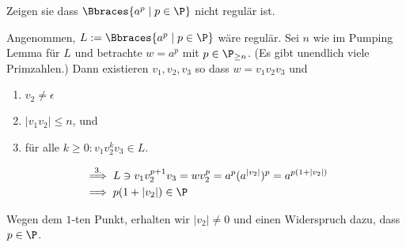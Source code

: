 
\begin{exercise}

Zeigen sie dass $\Bbraces{a^p \mid p \in \P}$ nicht regulär ist.

\end{exercise}


\begin{solution}

Angenommen, $L := \Bbraces{a^p \mid p \in \P}$ wäre regulär.
Sei $n$ wie im Pumping Lemma für $L$ und betrachte $w = a^p$ mit $p \in \P_{\geq n}$.
(Es gibt unendlich viele Primzahlen.)
Dann existieren $v_1, v_2, v_3$ so dass $w = v_1 v_2 v_3$ und

\begin{enumerate}
    \item $v_2 \neq \epsilon$
    \item $|v_1 v_2| \leq n$, und
    \item für alle $k \geq 0: v_1 v_2^k v_3 \in L$.
\end{enumerate}

\begin{align*}
    & \stackrel{3.}{\implies}
    L \ni v_1 v_2^{p+1} v_3 = w v_2^p = a^p (a^{|v_2|})^p = a^{p (1 + |v_2|)} \\
    & \implies
    p (1 + |v_2|) \in \P
\end{align*}

Wegen dem $1$-ten Punkt, erhalten wir $|v_2| \neq 0$ und einen Widerspruch dazu, dass $p \in \P$.

\end{solution}

